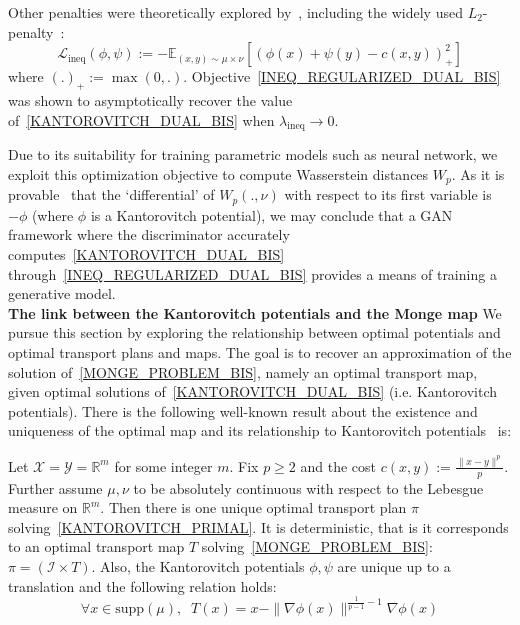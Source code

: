 \documentclass[runningheads]{llncs}
\newcommand\mycitet[1]{\cite{#1}}
\newcommand{\id}{\mathcal{I}}
\begin{document}
Other penalties were theoretically explored by~\mycitet{Blondel2018}, including the widely used $L_2$-penalty~\citep{Seguy2018LSOT}:
\[ \mathcal{L}_{\text{ineq}}(\phi,\psi):=- \mathds{E}_{(x,y) \sim \mu \times \nu} \left[\left(\phi(x)+\psi(y)-c(x,y)\right)_{+}^2 \right]    \]
where $(.)_+:= \max(0,.)$. Objective~\eqref{INEQ_REGULARIZED_DUAL_BIS} was shown to asymptotically recover the value of~\eqref{KANTOROVITCH_DUAL_BIS} when $\lambda_{\text{ineq}} \rightarrow 0$. 

Due to its suitability for training parametric models such as neural network, we exploit this optimization objective to compute Wasserstein distances $W_p$. As it is provable~\citep{Ambrosio2013} that the `differential' of $W_p(.,\nu)$ with respect to its first variable is $-\phi$ (where $\phi$ is a Kantorovitch potential), we may conclude that a GAN framework where the discriminator accurately computes~\eqref{KANTOROVITCH_DUAL_BIS} through~\eqref{INEQ_REGULARIZED_DUAL_BIS} provides a means of training a generative model.\\

\textbf{The link between the Kantorovitch potentials and the Monge map} We pursue this section by exploring the relationship between optimal potentials and optimal transport plans and maps. The goal is to recover an approximation of the solution of~\eqref{MONGE_PROBLEM_BIS}, namely an optimal transport map, given optimal solutions of~\eqref{KANTOROVITCH_DUAL_BIS} (i.e. Kantorovitch potentials). There is the following well-known result about the existence and uniqueness of the optimal map and its relationship to Kantorovitch potentials~\cite{brenier1991polar} is:

\begin{proposition}\label{prop:uniqueRelation}
\normalfont
Let $\mathcal{X}=\mathcal{Y}=\mathds{R}^m$ for some integer $m$. Fix $p\geqslant 2$ and the cost $c(x,y):= \frac{\|x-y\|^p}{p}$. Further assume $\mu,\nu$ to be absolutely continuous with respect to the Lebesgue measure on $\mathds{R}^m$. Then there is one unique optimal transport plan $\pi$ solving~\eqref{KANTOROVITCH_PRIMAL}. It is deterministic, that is it corresponds to an optimal transport map $T$ solving~\eqref{MONGE_PROBLEM_BIS}: $\pi=(\id \times T)$. Also, the Kantorovitch potentials $\phi,\psi$ are unique up to a translation and the following relation holds:
\begin{equation}
\forall x \in \text{supp}(\mu),\;\; T(x)=x- \|\nabla \phi(x)\|^{\frac{1}{p-1}-1}\nabla \phi(x)
\label{PRIMAL_DUAL_GENERAL_CORRESPONDANCE}
\end{equation}
\end{proposition}
\end{document}
